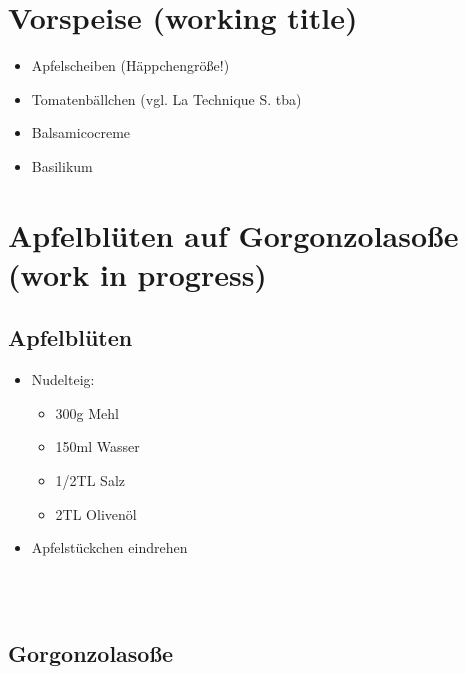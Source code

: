 \section{Vorspeise (working title)}
	
	\begin{itemize}
		\item Apfelscheiben (Häppchengröße!)
		\item Tomatenbällchen (vgl. La Technique S. tba)
		\item Balsamicocreme
		\item Basilikum
	\end{itemize}
	
\section{Apfelblüten auf Gorgonzolasoße (work in progress)}

	\subsection*{Apfelblüten}
		
		\begin{itemize}
			\item Nudelteig:
				\begin{itemize}
					\item 300g Mehl
					\item 150ml Wasser
					\item 1/2TL Salz
					\item 2TL Olivenöl
				\end{itemize}
			\item Apfelstückchen eindrehen
		\end{itemize}
		
		\begin{tabular}{rlL{10cm}}
			
		\end{tabular}\\
			
	\subsection*{Gorgonzolasoße}
		\begin{tabular}{rlL{9cm}}
			
		\end{tabular}\\
	
